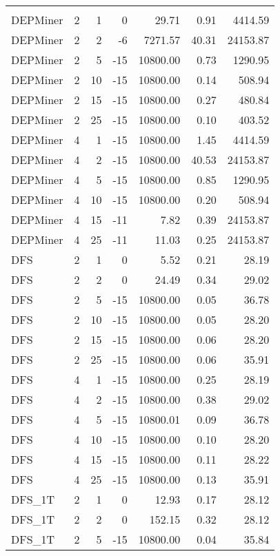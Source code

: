 \begin{center}
\begin{longtable}{lrrrrrr}
\hline\endlastfoot
\\
DEPMiner     & 2 & 1 &   0 & 29.71 & 0.91 & 4414.59 \\ 
  DEPMiner     & 2 & 2 &  -6 & 7271.57 & 40.31 & 24153.87 \\ 
  DEPMiner     & 2 & 5 & -15 & 10800.00 & 0.73 & 1290.95 \\ 
  DEPMiner     & 2 & 10 & -15 & 10800.00 & 0.14 & 508.94 \\ 
  DEPMiner     & 2 & 15 & -15 & 10800.00 & 0.27 & 480.84 \\ 
  DEPMiner     & 2 & 25 & -15 & 10800.00 & 0.10 & 403.52 \\ 
  DEPMiner     & 4 & 1 & -15 & 10800.00 & 1.45 & 4414.59 \\ 
  DEPMiner     & 4 & 2 & -15 & 10800.00 & 40.53 & 24153.87 \\ 
  DEPMiner     & 4 & 5 & -15 & 10800.00 & 0.85 & 1290.95 \\ 
  DEPMiner     & 4 & 10 & -15 & 10800.00 & 0.20 & 508.94 \\ 
  DEPMiner     & 4 & 15 & -11 & 7.82 & 0.39 & 24153.87 \\ 
  DEPMiner     & 4 & 25 & -11 & 11.03 & 0.25 & 24153.87 \\ 
  DFS     & 2 & 1 &   0 & 5.52 & 0.21 & 28.19 \\ 
  DFS     & 2 & 2 &   0 & 24.49 & 0.34 & 29.02 \\ 
  DFS     & 2 & 5 & -15 & 10800.00 & 0.05 & 36.78 \\ 
  DFS     & 2 & 10 & -15 & 10800.00 & 0.05 & 28.20 \\ 
  DFS     & 2 & 15 & -15 & 10800.00 & 0.06 & 28.20 \\ 
  DFS     & 2 & 25 & -15 & 10800.00 & 0.06 & 35.91 \\ 
  DFS     & 4 & 1 & -15 & 10800.00 & 0.25 & 28.19 \\ 
  DFS     & 4 & 2 & -15 & 10800.00 & 0.38 & 29.02 \\ 
  DFS     & 4 & 5 & -15 & 10800.01 & 0.09 & 36.78 \\ 
  DFS     & 4 & 10 & -15 & 10800.00 & 0.10 & 28.20 \\ 
  DFS     & 4 & 15 & -15 & 10800.00 & 0.11 & 28.22 \\ 
  DFS     & 4 & 25 & -15 & 10800.00 & 0.13 & 35.91 \\ 
  DFS\_1T     & 2 & 1 &   0 & 12.93 & 0.17 & 28.12 \\ 
  DFS\_1T     & 2 & 2 &   0 & 152.15 & 0.32 & 28.12 \\ 
  DFS\_1T     & 2 & 5 & -15 & 10800.00 & 0.04 & 35.84 \\ 

\end{longtable}
\end{center}
